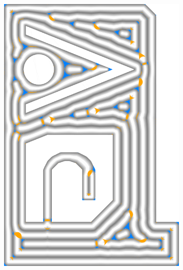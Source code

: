 \begin{figure}
\begin{subfigure}{\figwidth}
\includegraphics[width=\columnwidth]{sources/validation/gMAT_example/TEST_InwardDistributed_accuracy.png}

\end{subfigure}
\end{figure}
